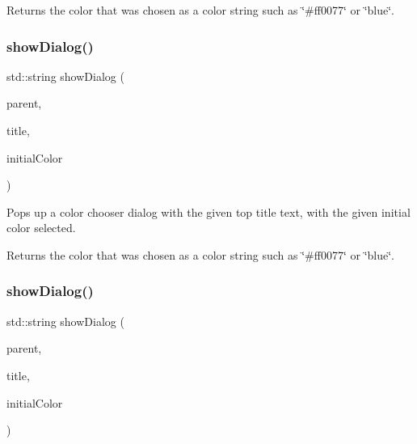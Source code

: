 Returns the color that was chosen as a color string such as \char`\"{}\#ff0077\char`\"{} or \char`\"{}blue\char`\"{}. \mbox{\label{classGColorChooser_a2c513cab2b8e569b35327f89117b077f}} 
\subsubsection{\texorpdfstring{show\+Dialog()}{showDialog()}\hspace{0.1cm}{\footnotesize\ttfamily [2/6]}}
{\footnotesize\ttfamily std\+::string show\+Dialog (\begin{DoxyParamCaption}\item[{\mbox{\hyperlink{classGWindow}{G\+Window}} $\ast$}]{parent,  }\item[{const std\+::string \&}]{title,  }\item[{int}]{initial\+Color }\end{DoxyParamCaption})\hspace{0.3cm}{\ttfamily [static]}}



Pops up a color chooser dialog with the given top title text, with the given initial color selected. 

Returns the color that was chosen as a color string such as \char`\"{}\#ff0077\char`\"{} or \char`\"{}blue\char`\"{}. \mbox{\label{classGColorChooser_a8bac6bfe2b583f676c2ede745053fff6}} 
\subsubsection{\texorpdfstring{show\+Dialog()}{showDialog()}\hspace{0.1cm}{\footnotesize\ttfamily [3/6]}}
{\footnotesize\ttfamily std\+::string show\+Dialog (\begin{DoxyParamCaption}\item[{Q\+Widget $\ast$}]{parent,  }\item[{const std\+::string \&}]{title,  }\item[{int}]{initial\+Color }\end{DoxyParamCaption})\hspace{0.3cm}{\ttfamily [static]}}



